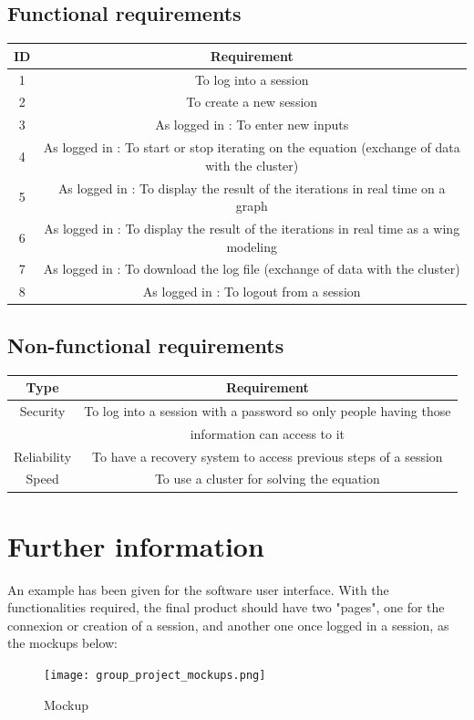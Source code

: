\documentclass[10pt,a4paper]{report}
\begin{document}
		\subsection{Functional requirements}
\begin{tabular}{|c|c|}
\hline 
\textbf{ID} & \textbf{Requirement} \\ 
\hline 
1 & To log into a session \\ 
\hline 
2 & To create a new session \\ 
\hline 
3 & As logged in : To enter new inputs \\ 
\hline
4 & As logged in : To start or stop iterating on the equation (exchange of data with the cluster) \\ 
\hline
5 & As logged in : To display the result of the iterations in real time on a graph \\ 
\hline
6 & As logged in : To display the result of the iterations in real time as a wing modeling \\ 
\hline
7 & As logged in : To download the log file (exchange of data with the cluster)\\ 
\hline
8 & As logged in : To logout from a session \\ 
\hline
\end{tabular} 
		\subsection{Non-functional requirements}
\begin{tabular}{|c|c|}
\hline 
\textbf{Type} & \textbf{Requirement} \\ 
\hline 
Security & To log into a session with a password so only people having those\\
 & information can access to it\\ 
\hline 
Reliability & To have a recovery system to access previous steps of a session \\ 
\hline 
Speed & To use a cluster for solving the equation \\ 
\hline
\end{tabular} 
	\section{Further information}
An example has been given for the software user interface. With the functionalities required, the final product should have two "pages", one for the connexion or creation of a session, and another one once logged in a session, as the mockups below:\\
\begin{figure}[h!]
\texttt{[image: group\_project\_mockups.png]}
\caption{Mockup}
\end{figure}
\end{document}
